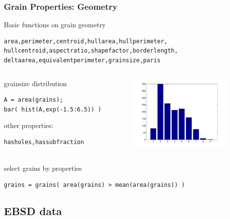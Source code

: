 \begin{frame}[fragile]
  \frametitle{Grain Properties: Geometry}

Basic functions on grain geometry
\begin{lstlisting}[basicstyle=\footnotesize]
area,perimeter,centroid,hullarea,hullperimeter,
hullcentroid,aspectratio,shapefactor,borderlength,
deltaarea,equivalentperimeter,grainsize,paris
\end{lstlisting}

\begin{columns}[t]
  \begin{column}[T]{6.5cm}

\medskip

  grainsize distribution
\begin{lstlisting}
A = area(grains);
bar( hist(A,exp(-1.5:6.5)) )
\end{lstlisting}

\medskip

other properties:
\begin{lstlisting}[basicstyle=\footnotesize]
hasholes,hassubfraction
\end{lstlisting}

	\end{column}
	\begin{column}[T]{5cm}
		\includegraphics[width=5cm]{pic/grh}
	\end{column}
\end{columns}

select grains by properties
\begin{lstlisting}
grains = grains( area(grains) > mean(area(grains)) )
\end{lstlisting}

\end{frame}


%

\subsection*{EBSD data}


